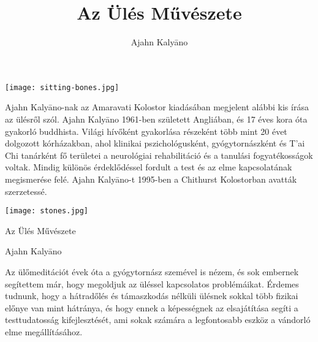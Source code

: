 \documentclass[12pt,oneside,landscape,final]{memoir}
\begin{document}
\title{Az Ülés Művészete}
\author{Ajahn Kalyāno}

\newlength{\foldmarkhoriz}
\setlength{\foldmarkhoriz}{\stockwidth}
\addtolength{\foldmarkhoriz}{-0.5pt}

\AddToShipoutPicture{%
\put(\LenToUnit{\foldmarkhoriz},\LenToUnit{0pt}){%
\color[gray]{0.5}\rule{1pt}{8mm}%
}%
\put(\LenToUnit{\foldmarkhoriz},\LenToUnit{202mm}){%
\color[gray]{0.5}\rule{1pt}{8mm}%
}%
}

\pagestyle{empty}
\setlength{\parindent}{0pt}
\setlength{\parskip}{0.6\baselineskip}

\mbox{}\vfill

{\centering
\texttt{[image: sitting-bones.jpg]}
\par}

\vfill\mbox{}

\clearpage

\mbox{}\vfill

{\centering

Ajahn Kalyāno-nak az Amaravati Kolostor kiadásában megjelent alábbi kis írása az
ülésről szól. Ajahn Kalyāno 1961-ben született Angliában, és 17 éves kora óta
gyakorló buddhista. Világi hívőként gyakorlása részeként több mint 20 évet
dolgozott kórházakban, ahol klinikai pszichológusként, gyógytornászként és T’ai
Chi tanárként fő területei a neurológiai rehabilitáció és a tanulási
fogyatékosságok voltak. Mindig különös érdeklődéssel fordult a test és az elme
kapcsolatának megismerése felé. Ajahn Kalyāno-t 1995-ben a Chithurst Kolostorban
avatták szerzetessé.

}

\vfill\mbox{}

\clearpage

\mbox{}\vfill

{\centering
\texttt{[image: stones.jpg]}
\par}

{\centering
{\Huge Az Ülés Művészete}

Ajahn Kalyāno
\par}

\vfill\mbox{}

\clearpage

Az ülőmeditációt évek óta a gyógytornász szemével is nézem, és sok embernek
segítettem már, hogy megoldjuk az üléssel kapcsolatos problémáikat. Érdemes
tudnunk, hogy a hátradőlés és támaszkodás nélküli ülésnek sokkal több fizikai
előnye van mint hátránya, és hogy ennek a képességnek az elsajátítása segíti a
testtudatosság kifejlesztését, ami sokak számára a legfontosabb eszköz a
vándorló elme megállításához.
\end{document}
